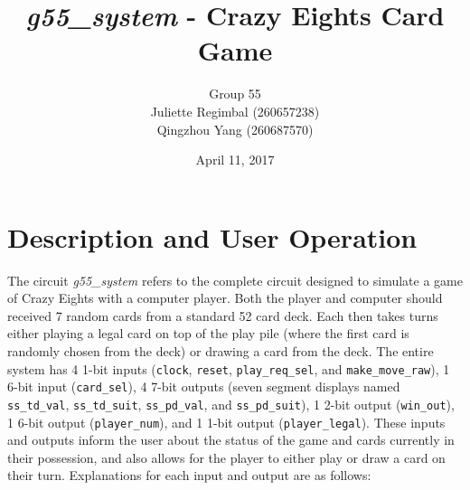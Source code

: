 \documentclass[12pt]{article}
\title{\textit{g55\_system} - Crazy Eights Card Game}
\author{Group 55\\Juliette Regimbal (260657238)\\Qingzhou Yang (260687570)}
\date{April 11, 2017}
\begin{document}
\maketitle
\setlength{\parindent}{0ex}

\section{Description and User Operation}
The circuit \textit{g55\_system} refers to the complete circuit designed to simulate a game of Crazy Eights with a computer player. Both the player and computer should received 7 random cards from a standard 52 card deck. Each then takes turns either playing a legal card on top of the play pile (where the first card is randomly chosen from the deck) or drawing a card from the deck. The entire system has 4 1-bit inputs (\texttt{clock}, \texttt{reset}, \texttt{play\_req\_sel}, and \texttt{make\_move\_raw}),  1 6-bit input (\texttt{card\_sel}), 4 7-bit outputs (seven segment displays named \texttt{ss\_td\_val}, \texttt{ss\_td\_suit}, \texttt{ss\_pd\_val}, and \texttt{ss\_pd\_suit}), 1 2-bit output (\texttt{win\_out}), 1 6-bit output (\texttt{player\_num}), and 1 1-bit output (\texttt{player\_legal}).  These inputs and outputs inform the user about the status of the game and cards currently in their possession, and also allows for the player to either play or draw a card on their turn. Explanations for each input and output are as follows:\\
\end{document}
